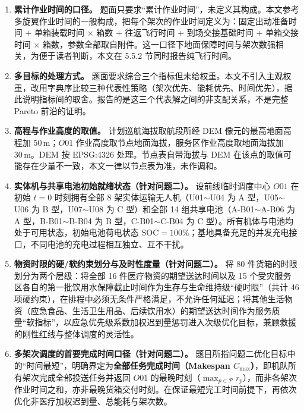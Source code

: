 \documentclass[withoutpreface,bwprint]{format}
\begin{document}
\begin{enumerate}[label=\textbf{假设 \arabic*：}, leftmargin=*]
    \item \textbf{累计作业时间的口径。} 题面只要求“累计作业时间”，未定义其构成。本文参考多旋翼作业时间的一般构成\cite{liu2017}，把每个架次的作业时间定义为：固定出动准备时间 $+$ 单箱装载时间 $\times$ 箱数 $+$ 往返飞行时间 $+$ 到场交接基础时间 $+$ 单箱交接时间 $\times$ 箱数，参数全部取自附件。这一口径下地面保障时间与架次数强相关，为便于读者判断，本文在 5.5.2 节同时报告纯飞行时间。

    \item \textbf{多目标的处理方式。} 题面要求综合三个指标但未给权重。本文不引入主观权重，改用字典序比较三种代表性策略（架次优先、能耗优先、时间优先），据此说明指标间的取舍。报告的是这三个代表解之间的非支配关系，不是完整 Pareto 前沿的证明。

    \item \textbf{高程与作业高度的取值。} 计划巡航海拔取航段所经 DEM 像元的最高地面高程加 $50\,\text{m}$；$O01$ 作业高度取节点地面海拔，服务区作业高度取地面海拔加 $30\,\text{m}$。DEM 按 EPSG:4326 处理。节点表自带海拔与 DEM 在该点的取值可能存在少量不一致，本文一律以节点表为准，未作调和。

    \item \textbf{实体机与共享电池初始就绪状态（针对问题二）。} 设前线临时调度中心 $O01$ 在初始 $t=0$ 时刻拥有全部 8 架实体运输无人机（U01$\sim$U04 为 A 型，U05$\sim$U06 为 B 型，U07$\sim$U08 为 C 型）和全部 14 组共享电池（A-B01$\sim$A-B06 为 A 型，B-B01$\sim$B-B04 为 B 型，C-B01$\sim$C-B04 为 C 型）。所有机体与电池均处于可用状态，初始电池荷电状态 $\text{SOC}=100\%$；基地具备充足的并发充电接口，不同电池的充电过程相互独立、互不干扰。

    \item \textbf{物资时限的硬/软约束划分与及时性度量（针对问题二）。} 将 80 件货箱的时限划分为两个层级：将全部 16 件医疗物资的期望送达时间以及 15 个受灾服务区各自的第一批饮用水保障截止时间作为生存与生命维持级“硬时限”（共计 46 项硬约束），在排程中必须无条件严格满足，不允许任何延迟；将其他生活物资（应急食品、生活卫生用品、后续饮用水）的期望送达时间作为服务质量“软指标”，以应急优先级系数加权迟到量惩罚进入次级优化目标，兼顾救援的刚性红线与整体调度的灵活性。

    \item \textbf{多架次调度的首要完成时间口径（针对问题二）。} 题目所指问题二优化目标中的“时间最短”，明确界定为\textbf{全部任务完成时间（Makespan $C_{\max}$）}，即机队所有架次完成全部投送任务并返回 $O01$ 的最晚时刻（$\max_{p \in \mathcal{P}} r_p$），而非各架次作业时间之和，亦非最晚货箱交付时刻。在保证最短完工时间前提下，再依次优化非医疗加权迟到量、总能耗与架次数。
\end{enumerate}
\end{document}
